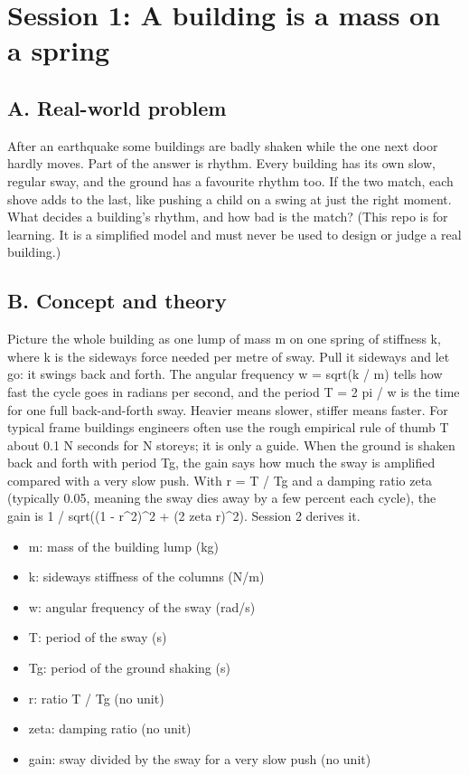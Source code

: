 \documentclass[11pt,a4paper]{article}
\begin{document}
\section{Session 1: A building is a mass on a spring}

\subsection*{A. Real-world problem}
After an earthquake some buildings are badly shaken while the one next door hardly moves. Part of the answer is rhythm. Every building has its own slow, regular sway, and the ground has a favourite rhythm too. If the two match, each shove adds to the last, like pushing a child on a swing at just the right moment. What decides a building's rhythm, and how bad is the match? (This repo is for learning. It is a simplified model and must never be used to design or judge a real building.)

\subsection*{B. Concept and theory}
Picture the whole building as one lump of mass m on one spring of stiffness k, where k is the sideways force needed per metre of sway. Pull it sideways and let go: it swings back and forth. The angular frequency w = sqrt(k / m) tells how fast the cycle goes in radians per second, and the period T = 2 pi / w is the time for one full back-and-forth sway. Heavier means slower, stiffer means faster. For typical frame buildings engineers often use the rough empirical rule of thumb T about 0.1 N seconds for N storeys; it is only a guide. When the ground is shaken back and forth with period Tg, the gain says how much the sway is amplified compared with a very slow push. With r = T / Tg and a damping ratio zeta (typically 0.05, meaning the sway dies away by a few percent each cycle), the gain is 1 / sqrt((1 - r\textasciicircum{}2)\textasciicircum{}2 + (2 zeta r)\textasciicircum{}2). Session 2 derives it.

\begin{itemize}[nosep]
\item m: mass of the building lump (kg)
\item k: sideways stiffness of the columns (N/m)
\item w: angular frequency of the sway (rad/s)
\item T: period of the sway (s)
\item Tg: period of the ground shaking (s)
\item r: ratio T / Tg (no unit)
\item zeta: damping ratio (no unit)
\item gain: sway divided by the sway for a very slow push (no unit)
\end{itemize}
\end{document}
